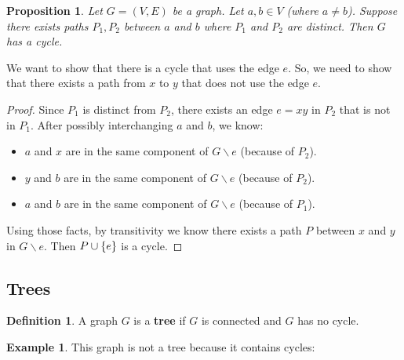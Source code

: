 \documentclass[]{article}
\newtheorem*{proposition}{Proposition}
\theoremstyle{definition}
\newtheorem*{defn}{Definition}
\newtheorem{ex}{Example}[section]
\DeclarePairedDelimiter{\set}{\lbrace}{\rbrace}
\begin{document}
				\begin{proposition}
					Let $G = (V, E)$ be a graph. Let $a, b \in V$ (where $a \ne b$). Suppose there exists paths $P_1, P_2$ between $a$ and $b$ where $P_1$ and $P_2$ are distinct. Then $G$ has a cycle.
				\end{proposition}

				We want to show that there is a cycle that uses the edge $e$. So, we need to show that there exists a path from $x$ to $y$ that does not use the edge $e$.

				\begin{proof}
					Since $P_1$ is distinct from $P_2$, there exists an edge $e = xy$ in $P_2$ that is not in $P_1$. After possibly interchanging $a$ and $b$, we know:
					\begin{itemize}
						\item $a$ and $x$ are in the same component of $G \backslash e$ (because of $P_2$).
						\item $y$ and $b$ are in the same component of $G \backslash e$ (because of $P_2$).
						\item $a$ and $b$ are in the same component of $G \backslash e$ (because of $P_1$).
					\end{itemize}

					Using those facts, by transitivity we know there exists a path $P$ between $x$ and $y$ in $G \backslash e$. Then $P \cup \set{e}$ is a cycle.
				\end{proof}
		\subsection{Trees}
			\begin{defn}
				A graph $G$ is a \textbf{tree} if $G$ is connected and $G$ has no cycle.
			\end{defn}

			\begin{ex}
				This graph is not a tree because it contains cycles:
				\begin{center}
				\end{center}
			\end{ex}
\end{document}
